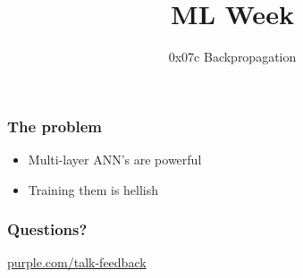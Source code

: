 
\title
{ML Week}
\subtitle{0x07c \hspace{2mm}  Backpropagation}




\begin{frame}
  \titlepage
\end{frame}


\begin{frame}
\end{frame}

\begin{frame}
  \frametitle{The problem}
  \begin{itemize}
  \item Multi-layer ANN's are powerful
  \item Training them is hellish
  \end{itemize}
\end{frame}

\begin{frame}
\end{frame}

\begin{frame}
\end{frame}


\begin{frame}
  \frametitle{Questions?}
  \centerline{\large\url{purple.com/talk-feedback}}
\end{frame}


